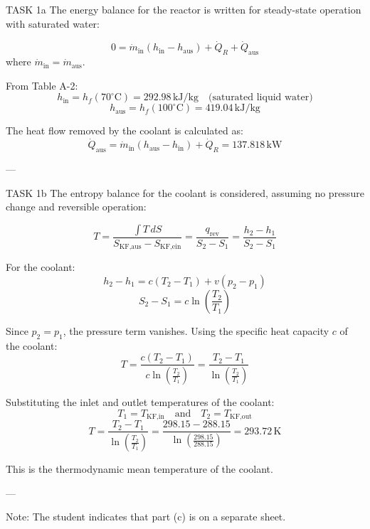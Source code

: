 TASK 1a  
The energy balance for the reactor is written for steady-state operation with saturated water:  

\[
0 = \dot{m}_{\text{in}} (h_{\text{in}} - h_{\text{aus}}) + \dot{Q}_R + \dot{Q}_{\text{aus}}
\]
where \( \dot{m}_{\text{in}} = \dot{m}_{\text{aus}} \).  

From Table A-2:  
\[
h_{\text{in}} = h_f(70^\circ\text{C}) = 292.98 \, \text{kJ/kg} \quad \text{(saturated liquid water)}
\]  
\[
h_{\text{aus}} = h_f(100^\circ\text{C}) = 419.04 \, \text{kJ/kg}
\]  

The heat flow removed by the coolant is calculated as:  
\[
\dot{Q}_{\text{aus}} = \dot{m}_{\text{in}} (h_{\text{aus}} - h_{\text{in}}) + \dot{Q}_R = 137.818 \, \text{kW}
\]  

---

TASK 1b  
The entropy balance for the coolant is considered, assuming no pressure change and reversible operation:  

\[
T = \frac{\int T \, dS}{S_{\text{KF,aus}} - S_{\text{KF,ein}}} = \frac{q_{\text{rev}}}{S_2 - S_1} = \frac{h_2 - h_1}{S_2 - S_1}
\]  

For the coolant:  
\[
h_2 - h_1 = c (T_2 - T_1) + v (p_2 - p_1)
\]  
\[
S_2 - S_1 = c \ln \left( \frac{T_2}{T_1} \right)
\]  

Since \( p_2 = p_1 \), the pressure term vanishes. Using the specific heat capacity \( c \) of the coolant:  
\[
T = \frac{c (T_2 - T_1)}{c \ln \left( \frac{T_2}{T_1} \right)} = \frac{T_2 - T_1}{\ln \left( \frac{T_2}{T_1} \right)}
\]  

Substituting the inlet and outlet temperatures of the coolant:  
\[
T_1 = T_{\text{KF,in}} \quad \text{and} \quad T_2 = T_{\text{KF,out}}
\]  
\[
T = \frac{T_2 - T_1}{\ln \left( \frac{T_2}{T_1} \right)} = \frac{298.15 - 288.15}{\ln \left( \frac{298.15}{288.15} \right)} = 293.72 \, \text{K}
\]  

This is the thermodynamic mean temperature of the coolant.  

---

Note: The student indicates that part (c) is on a separate sheet.